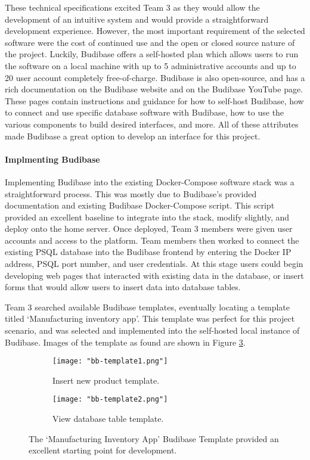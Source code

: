 \documentclass{article}
\begin{document}
These technical specifications excited Team 3 as they would allow the development of an intuitive system and would provide a 
straightforward development experience. However, the most important requirement of the selected software were the cost of continued use
and the open or closed source nature of the project. Luckily, Budibase offers a self-hosted plan which allows users to run the software 
on a local machine with up to 5 administrative accounts and up to 20 user account completely free-of-charge. Budibase is also open-source,
and has a rich documentation on the Budibase website \cite{budibase-docs} and on the Budibase YouTube page. \cite{budibase-youtube}
These pages contain instructions and guidance 
for how to self-host Budibase, how to connect and use specific database software with Budibase, how to use the various components to 
build desired interfaces, and more. All of these attributes made Budibase a great option to develop an interface for this project.
\paragraph{Implmenting Budibase}
Implementing Budibase into the existing Docker-Compose software stack was a straightforward process. This was mostly due to Budibase's 
provided documentation and existing Budibase Docker-Compose script. This script provided an excellent baseline to integrate into the 
stack, modify slightly, and deploy onto the home server. Once deployed, Team 3 members were given user accounts and access to the 
platform. Team members then worked to connect the existing PSQL database into the Budibase frontend by entering the Docker IP 
address, PSQL port number, and user credentials. At this stage users could begin developing web pages that interacted with existing 
data in the database, or insert forms that would allow users to insert data into database tables.

Team 3 searched available Budibase templates, eventually locating a template titled `Manufacturing inventory app'. This template was 
perfect for this project scenario, and was selected and implemented into the self-hosted local instance of Budibase. Images of the 
template as found are shown in Figure \ref{fig:bb_templates}.

\begin{figure}[h!]
    \centering
    \begin{subfigure}[b]{\textwidth}
        \centering
        \texttt{[image: "bb-template1.png"]}
        \caption{Insert new product template.}
        \label{fig:bb_temp1}
    \end{subfigure}
    \begin{subfigure}[b]{\textwidth}
        \centering
        \texttt{[image: "bb-template2.png"]}
        \caption{View database table template.}
        \label{fig:bb_temp2}
    \end{subfigure}
    \caption{The `Manufacturing Inventory App' Budibase Template provided an excellent starting point for development.}
    \label{fig:bb_templates}
\end{figure}
\FloatBarrier
\end{document}
